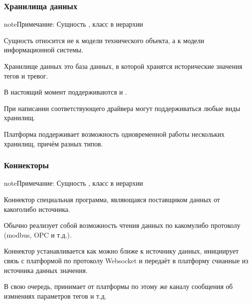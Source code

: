 \documentclass[a4paper,10pt,russian]{sphinxmanual}
\begin{document}
\subsubsection{Хранилища данных}
\label{\detokenize{architecture:id10}}
\begin{sphinxadmonition}{note}{Примечание:}
\sphinxAtStartPar
Сущность , класс в иерархии 
\end{sphinxadmonition}

\sphinxAtStartPar
Сущность относится не к модели технического объекта, а к модели информационной
системы.

\sphinxAtStartPar
Хранилище данных \sphinxhyphen{} это база данных, в которой хранятся исторические значения
тегов и тревог.

\sphinxAtStartPar
В настоящий момент поддерживаются 
и .

\sphinxAtStartPar
При написании соответствующего драйвера могут поддерживаться любые виды
хранилищ.

\sphinxAtStartPar
Платформа поддерживает возможность одновременной работы нескольких хранилищ,
причём разных типов.


\subsubsection{Коннекторы}
\label{\detokenize{architecture:id11}}
\begin{sphinxadmonition}{note}{Примечание:}
\sphinxAtStartPar
Сущность , класс в иерархии 
\end{sphinxadmonition}

\sphinxAtStartPar
Коннектор \sphinxhyphen{} специальная программа, являющаяся поставщиком данных от какого\sphinxhyphen{}либо
источника.

\sphinxAtStartPar
Обычно реализует собой возможность чтения данных по какому\sphinxhyphen{}либо протоколу
(modbus, OPC и т.д.).

\sphinxAtStartPar
Коннектор устанавливается как можно ближе к источнику данных,
инициирует связь с платформой по протоколу Websocket и передаёт в платформу
счианные из источника данных значения.

\sphinxAtStartPar
В свою очередь, принимает от платформы по этому же каналу сообщения об
измнениях параметров тегов и т.д.
\end{document}
